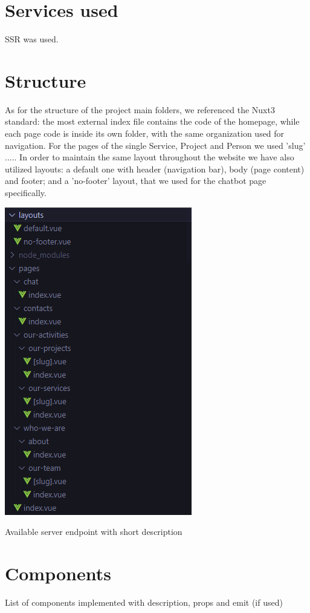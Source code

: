 \section{Services used}
SSR was used. %

\section{Structure}
As for the structure of the project main folders, we referenced the Nuxt3 standard: the most external index file
contains the code of the homepage, while each page code is inside its own folder, with the same organization used for navigation.
For the pages of the single Service, Project and Person we used 'slug' .....
In order to maintain the same layout throughout the website we have also utilized layouts: a default one with header (navigation bar), body (page content) and footer;
and a 'no-footer' layout, that we used for the chatbot page specifically.


\begin{center}
    \includegraphics[width=0.4\linewidth]{img/folders-structure.png}
\end{center}

\vspace{1em}
Available server endpoint with short description

\section{Components}
List of components implemented with description, props and emit (if used)

